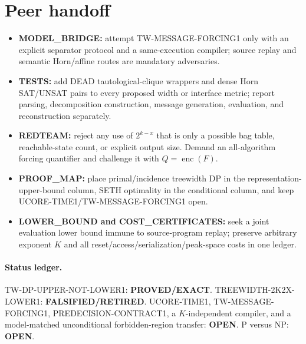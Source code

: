 \documentclass[11pt]{article}
\newcommand{\enc}{\operatorname{enc}}
\begin{document}
\section{Peer handoff}
\begin{itemize}[leftmargin=*]
\item \textbf{MODEL\_BRIDGE:} attempt TW-MESSAGE-FORCING1 only with an
explicit separator protocol and a same-execution compiler; source replay and
semantic Horn/affine routes are mandatory adversaries.
\item \textbf{TESTS:} add DEAD tautological-clique wrappers and dense Horn
SAT/UNSAT pairs to every proposed width or interface metric; report parsing,
decomposition construction, message generation, evaluation, and
reconstruction separately.
\item \textbf{REDTEAM:} reject any use of $2^{k-x}$ that is only a possible
bag table, reachable-state count, or explicit output size.  Demand an
all-algorithm forcing quantifier and challenge it with $Q=\enc(F)$.
\item \textbf{PROOF\_MAP:} place primal/incidence treewidth DP in the
representation-upper-bound column, SETH optimality in the conditional
column, and keep UCORE-TIME1/TW-MESSAGE-FORCING1 open.
\item \textbf{LOWER\_BOUND and COST\_CERTIFICATES:} seek a joint evaluation
lower bound immune to source-program replay; preserve arbitrary exponent
$K$ and all reset/access/serialization/peak-space costs in one ledger.
\end{itemize}

\paragraph{Status ledger.}
\textsf{TW-DP-UPPER-NOT-LOWER1}: \textbf{PROVED/EXACT}.
\textsf{TREEWIDTH-2K2X-LOWER1}: \textbf{FALSIFIED/RETIRED}.
\textsf{UCORE-TIME1}, \textsf{TW-MESSAGE-FORCING1},
\textsf{PREDECISION-CONTRACT1}, a $K$-independent compiler, and a
model-matched unconditional forbidden-region transfer: \textbf{OPEN}.
P versus NP: \textbf{OPEN}.

\end{document}
